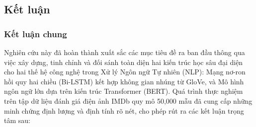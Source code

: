 \documentclass[a4paper]{article}
\theoremstyle{definition}
\begin{document}
\subsection{Kết luận}

\subsubsection{Kết luận chung}
Nghiên cứu này đã hoàn thành xuất sắc các mục tiêu đề ra ban đầu thông qua việc xây dựng, tinh chỉnh và đối sánh toàn diện hai kiến trúc học sâu đại diện cho hai thế hệ công nghệ trong Xử lý Ngôn ngữ Tự nhiên (NLP): Mạng nơ-ron hồi quy hai chiều (Bi-LSTM) kết hợp không gian nhúng từ GloVe, và Mô hình ngôn ngữ lớn dựa trên kiến trúc Transformer (BERT). Quá trình thực nghiệm trên tập dữ liệu đánh giá điện ảnh IMDb quy mô 50,000 mẫu đã cung cấp những minh chứng định lượng và định tính rõ nét, cho phép rút ra các kết luận trọng tâm sau:
\end{document}

